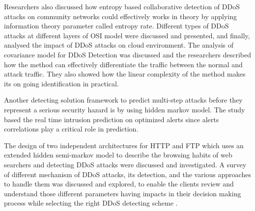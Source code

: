 \documentclass[letterpaper, 10 pt, conference]{ieeeconf}  %
\begin{document}
Researchers also discussed how entropy based collaborative detection of DDoS attacks on community networks could effectively works in theory by applying information theory parameter called entropy rate. Different types of DDoS attacks at different layers of OSI model were discussed and presented, and finally, analysed the impact of DDoS attacks on cloud environment. The analysis of covariance model for DDoS Detection was discussed and the researchers described how the method can effectively differentiate the traffic between the normal and attack traffic. They also showed how the linear complexity of the method makes its on going identification in practical.

Another detecting solution framework to predict multi-step attacks before they represent a serious security hazard is by using hidden markov model. The study based the real time intrusion prediction on optimized alerts since alerts correlations play a critical role in prediction. 

The design of two independent architectures for HTTP and FTP which uses an extended hidden semi-markov model to describe the browsing habits of web searchers and detecting DDoS attacks were discussed and investigated. A survey of different mechanism of DDoS attacks, its detection, and the various approaches to handle them was discussed and explored, to enable the clients review and understand those different parameters having impacts in their decision making process while selecting the right DDoS detecting scheme .
\end{document}
